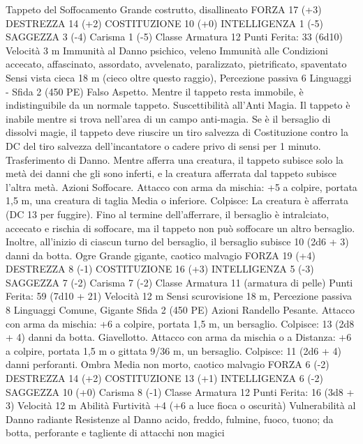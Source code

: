 \begin{multicols}{2}
Tappeto del Soffocamento
Grande costrutto, disallineato
FORZA 17 (+3)
DESTREZZA 14 (+2)
COSTITUZIONE 10 (+0)
INTELLIGENZA 1 (-5)
SAGGEZZA 3 (-4)
Carisma 1 (-5)
Classe Armatura 12
\hspace*{0pt}\hfill{Punti Ferita}: 33 (6d10)
Velocità 3 m
Immunità al Danno psichico, veleno
Immunità alle Condizioni accecato, affascinato, assordato,
avvelenato, paralizzato, pietrificato, spaventato
Sensi vista cieca 18 m (cieco oltre questo raggio), Percezione
passiva 6
Linguaggi -
Sfida 2 (450 PE)
Falso Aspetto. Mentre il tappeto resta immobile, è indistinguibile
da un normale tappeto.
Suscettibilità all’Anti Magia. Il tappeto è inabile mentre si trova
nell’area di un campo anti-magia. Se è il bersaglio di dissolvi
magie, il tappeto deve riuscire un tiro salvezza di Costituzione
contro la DC del tiro salvezza dell’incantatore o cadere privo di
sensi per 1 minuto.
Trasferimento di Danno. Mentre afferra una creatura, il tappeto
subisce solo la metà dei danni che gli sono inferti, e la creatura
afferrata dal tappeto subisce l’altra metà.
Azioni
Soffocare. Attacco con arma da mischia: +5 a colpire, portata
1,5 m, una creatura di taglia Media o inferiore.
Colpisce: La creatura è afferrata (DC 13 per fuggire). Fino al
termine dell’afferrare, il bersaglio è intralciato, accecato e rischia
di soffocare, ma il tappeto non può soffocare un altro bersaglio.
Inoltre, all’inizio di ciascun turno del bersaglio, il bersaglio
subisce 10 (2d6 + 3) danni da botta.
Ogre
Grande gigante, caotico malvagio
FORZA 19 (+4)
DESTREZZA 8 (-1)
COSTITUZIONE 16 (+3)
INTELLIGENZA 5 (-3)
SAGGEZZA 7 (-2)
Carisma 7 (-2)
Classe Armatura 11 (armatura di pelle)
\hspace*{0pt}\hfill{Punti Ferita}: 59 (7d10 + 21)
Velocità 12 m
Sensi scurovisione 18 m, Percezione passiva 8
Linguaggi Comune, Gigante
Sfida 2 (450 PE)
Azioni
Randello Pesante. Attacco con arma da mischia: +6 a colpire,
portata 1,5 m, un bersaglio.
Colpisce: 13 (2d8 + 4) danni da botta.
Giavellotto. Attacco con arma da mischia o a Distanza: +6 a
colpire, portata 1,5 m o gittata 9/36 m, un bersaglio.
Colpisce: 11 (2d6 + 4) danni perforanti.
Ombra
Media non morto, caotico malvagio
FORZA 6 (-2)
DESTREZZA 14 (+2)
COSTITUZIONE 13 (+1)
INTELLIGENZA 6 (-2)
SAGGEZZA 10 (+0)
Carisma 8 (-1)
Classe Armatura 12
\hspace*{0pt}\hfill{Punti Ferita}: 16 (3d8 + 3)
Velocità 12 m
Abilità Furtività +4 (+6 a luce fioca o oscurità)
Vulnerabilità al Danno radiante
Resistenze al Danno acido, freddo, fulmine, fuoco, tuono;
da botta, perforante e tagliente di attacchi non magici

\end{multicols}

